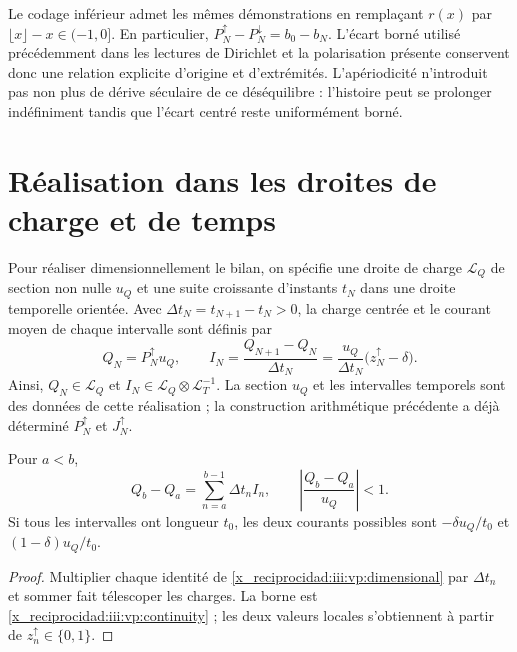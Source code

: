 Le codage inférieur admet les mêmes démonstrations en remplaçant
$r(x)$ par $\lfloor x\rfloor-x\in(-1,0]$. En particulier,
$P_N^{\uparrow}-P_N^{\downarrow}=b_0-b_N$. L’écart borné
utilisé précédemment dans les lectures de Dirichlet et la polarisation
présente conservent donc une relation explicite d’origine et d’extrémités.
L’apériodicité n’introduit pas non plus de dérive séculaire de ce déséquilibre :
l’histoire peut se prolonger indéfiniment tandis que l’écart
centré reste uniformément borné.

\section{Réalisation dans les droites de charge et de temps}

Pour réaliser dimensionnellement le bilan, on spécifie une droite de charge
$\mathcal L_Q$ de section non nulle $u_Q$ et une suite croissante
d’instants $t_N$ dans une droite temporelle orientée. Avec
$\Delta t_N=t_{N+1}-t_N>0$, la charge centrée et le courant moyen de
chaque intervalle sont définis par
\begin{equation}
 Q_N=P_N^{\uparrow}u_Q,\qquad
 I_N=\frac{Q_{N+1}-Q_N}{\Delta t_N}
     =\frac{u_Q}{\Delta t_N}\bigl(z_N^{\uparrow}-\delta\bigr).
 \label{x_reciprocidad:iii:vp:dimensional}
\end{equation}
Ainsi, $Q_N\in\mathcal L_Q$ et $I_N\in\mathcal L_Q\otimes\mathcal L_T^{-1}$. La section $u_Q$ et les intervalles temporels sont des données de cette réalisation ; la construction arithmétique précédente a déjà déterminé $P_N^{\uparrow}$ et $J_N^{\uparrow}$.

\begin{proposition}
Pour $a<b$,
\begin{equation}
 Q_b-Q_a=\sum_{n=a}^{b-1}\Delta t_n I_n,
 \qquad
 \left|\frac{Q_b-Q_a}{u_Q}\right|<1.
 \label{x_reciprocidad:iii:vp:dimensional-balance}
\end{equation}
Si tous les intervalles ont longueur $t_0$, les deux courants possibles
sont $-\delta u_Q/t_0$ et $(1-\delta)u_Q/t_0$.
\end{proposition}
\begin{proof}
Multiplier chaque identité de \eqref{x_reciprocidad:iii:vp:dimensional} par
$\Delta t_n$ et sommer fait télescoper les charges. La borne est
\eqref{x_reciprocidad:iii:vp:continuity} ; les deux valeurs locales s’obtiennent à partir de
$z_n^{\uparrow}\in\{0,1\}$.
\end{proof}

